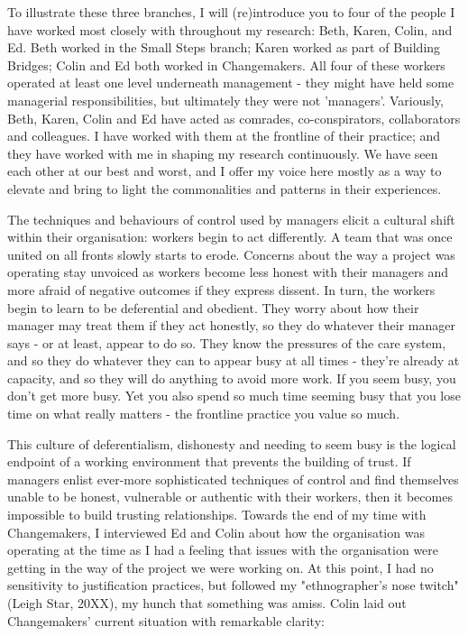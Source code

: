To illustrate these three branches, I will (re)introduce you to four of the people I have worked most closely with throughout my research: Beth, Karen, Colin, and Ed. Beth worked in the Small Steps branch; Karen worked as part of Building Bridges; Colin and Ed both worked in Changemakers. All four of these workers operated at least one level underneath management - they might have held some managerial responsibilities, but ultimately they were not 'managers'. Variously, Beth, Karen, Colin and Ed have acted as comrades, co-conspirators, collaborators and colleagues. I have worked with them at the frontline of their practice; and they have worked with me in shaping my research continuously. We have seen each other at our best and worst, and I offer my voice here mostly as a way to elevate and bring to light the commonalities and patterns in their experiences.

The techniques and behaviours of control used by managers elicit a cultural shift within their organisation: workers begin to act differently. A team that was once united on all fronts slowly starts to erode. Concerns about the way a project was operating stay unvoiced as workers become less honest with their managers and more afraid of negative outcomes if they express dissent. In turn, the workers begin to learn to be deferential and obedient. They worry about how their manager may treat them if they act honestly, so they do whatever their manager says - or at least, appear to do so. They know the pressures of the care system, and so they do whatever they can to appear busy at all times - they're already at capacity, and so they will do anything to avoid more work. If you seem busy, you don't get more busy. Yet you also spend so much time seeming busy that you lose time on what really matters - the frontline practice you value so much.

This culture of deferentialism, dishonesty and needing to seem busy is the logical endpoint of a working environment that prevents the building of trust. If managers enlist ever-more sophisticated techniques of control and find themselves unable to be honest, vulnerable or authentic with their workers, then it becomes impossible to build trusting relationships. Towards the end of my time with Changemakers, I interviewed Ed and Colin about how the organisation was operating at the time as I had a feeling that issues with the organisation were getting in the way of the project we were working on. At this point, I had no sensitivity to justification practices, but followed my "ethnographer's nose twitch" (Leigh Star, 20XX), my hunch that something was amiss. Colin laid out Changemakers' current situation with remarkable clarity:

